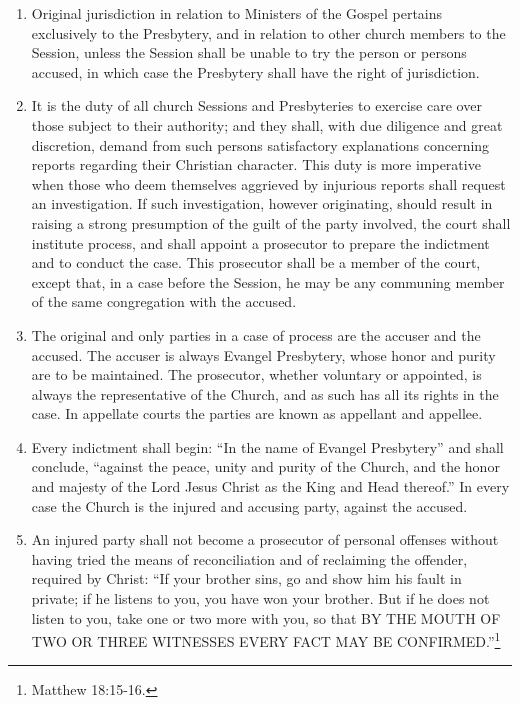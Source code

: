 \documentclass[
]{book}
\providecommand{\tightlist}{%
  \setlength{\itemsep}{0pt}\setlength{\parskip}{0pt}}
\begin{document}
\protect\hypertarget{chapter-slug-34-the-parties-in-cases-of-process}{\href{}{}}

\begin{enumerate}
\def\labelenumi{\arabic{enumi}.}
\tightlist
\item
  \protect\hypertarget{34}{\href{}{}}Original jurisdiction in relation to Ministers of the Gospel pertains exclusively to the Presbytery, and in relation to other church members to the Session, unless the Session shall be unable to try the person or persons accused, in which case the Presbytery shall have the right of jurisdiction.
\item
  \protect\hypertarget{34.2}{\href{}{}}It is the duty of all church Sessions and Presbyteries to exercise care over those subject to their authority; and they shall, with due diligence and great discretion, demand from such persons satisfactory explanations concerning reports regarding their Christian character. This duty is more imperative when those who deem themselves aggrieved by injurious reports shall request an investigation. If such investigation, however originating, should result in raising a strong presumption of the guilt of the party involved, the court shall institute process, and shall appoint a prosecutor to prepare the indictment and to conduct the case. This prosecutor shall be a member of the court, except that, in a case before the Session, he may be any communing member of the same congregation with the accused.
\item
  The original and only parties in a case of process are the accuser and the accused. The accuser is always Evangel Presbytery, whose honor and purity are to be maintained. The prosecutor, whether voluntary or appointed, is always the representative of the Church, and as such has all its rights in the case. In appellate courts the parties are known as appellant and appellee.
\item
  Every indictment shall begin: ``In the name of Evangel Presbytery'' and shall conclude, ``against the peace, unity and purity of the Church, and the honor and majesty of the Lord Jesus Christ as the King and Head thereof.'' In every case the Church is the injured and accusing party, against the accused.
\item
  An injured party shall not become a prosecutor of personal offenses without having tried the means of reconciliation and of reclaiming the offender, required by Christ: ``If your brother sins, go and show him his fault in private; if he listens to you, you have won your brother. But if he does not listen to you, take one or two more with you, so that BY THE MOUTH OF TWO OR THREE WITNESSES EVERY FACT MAY BE CONFIRMED.''\footnote{Matthew 18:15-16.}
\end{enumerate}
\end{document}

